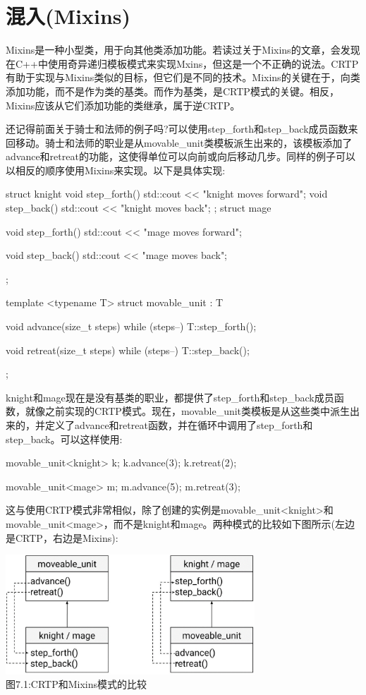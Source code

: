 \section{混入(Mixins)}
Mixins是一种小型类，用于向其他类添加功能。若读过关于Mixins的文章，会发现在C++中使用奇异递归模板模式来实现Mxins，但这是一个不正确的说法。CRTP有助于实现与Mixins类似的目标，但它们是不同的技术。Mixins的关键在于，向类添加功能，而不是作为类的基类。而作为基类，是CRTP模式的关键。相反，Mixins应该从它们添加功能的类继承，属于逆CRTP。

还记得前面关于骑士和法师的例子吗?可以使用step\_forth和step\_back成员函数来回移动。骑士和法师的职业是从movable\_unit类模板派生出来的，该模板添加了advance和retreat的功能，这使得单位可以向前或向后移动几步。同样的例子可以以相反的顺序使用Mixins来实现。以下是具体实现:

\begin{cpp}
struct knight
{
	void step_forth()
	{
		std::cout << "knight moves forward\n";
	}
	void step_back()
	{
		std::cout << "knight moves back\n";
	}
};
struct mage
{
	void step_forth()
	{
		std::cout << "mage moves forward\n";
	}

	void step_back()
	{
		std::cout << "mage moves back\n";
	}
};

template <typename T>
struct movable_unit : T
{
	void advance(size_t steps)
	{
		while (steps--)
			T::step_forth();
	}

	void retreat(size_t steps)
	{
		while (steps--)
			T::step_back();
	}
};
\end{cpp}

knight和mage现在是没有基类的职业，都提供了step\_forth和step\_back成员函数，就像之前实现的CRTP模式。现在，movable\_unit类模板是从这些类中派生出来的，并定义了advance和retreat函数，并在循环中调用了step\_forth和step\_back。可以这样使用:

\begin{cpp}
movable_unit<knight> k;
k.advance(3);
k.retreat(2);

movable_unit<mage> m;
m.advance(5);
m.retreat(3);
\end{cpp}

这与使用CRTP模式非常相似，除了创建的实例是movable\_unit<knight>和movable\_unit<mage>，而不是knight和mage。两种模式的比较如下图所示(左边是CRTP，右边是Mixins):

\begin{center}
\includegraphics[width=0.7\textwidth]{images/1.png}\\
图7.1:CRTP和Mixins模式的比较
\end{center}

